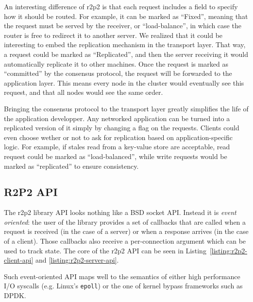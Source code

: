 An interesting difference of \gls{r2p2} is that each request includes a field to specify how it should be routed.
For example, it can be marked as ``Fixed'', meaning that the request must be served by the receiver, or ``load-balance'', in which case the router is free to redirect it to another server.
We realized that it could be interesting to embed the replication mechanism in the transport layer.
That way, a request could be marked as ``Replicated'', and then the server receiving it would automatically replicate it to other machines.
Once the request is marked as ``committed'' by the consensus protocol, the request will be forwarded to the application layer.
This means every node in the cluster would eventually see this request, and that all nodes would see the same order.

Bringing the consensus protocol to the transport layer greatly simplifies the life of the application developper.
Any networked application can be turned into a replicated version of it simply by changing a flag on the requests.
Clients could even choose wether or not to ask for replication based on application-specific logic.
For example, if stales read from a key-value store are acceptable, read request could be marked as ``load-balanced'', while write requests would be marked as ``replicated'' to ensure consistency.

\subsection{R2P2 API}

The \gls{r2p2} library API looks nothing like a BSD socket API.
Instead it is \emph{event oriented}: the user of the library provides a set of callbacks that are called when a request is received (in the case of a server) or when a response arrives (in the case of a client).
Those callbacks also receive a per-connection argument which can be used to track state.
The core of the \gls{r2p2} API can be seen in Listing~\ref{listing:r2p2-client-api} and \ref{listing:r2p2-server-api}.

Such event-oriented API maps well to the semantics of either high performance I/O syscalls (e.g. Linux's \texttt{epoll}) or the one of kernel bypass frameworks such as DPDK.

\begin{lstfloat}

\end{lstfloat}

